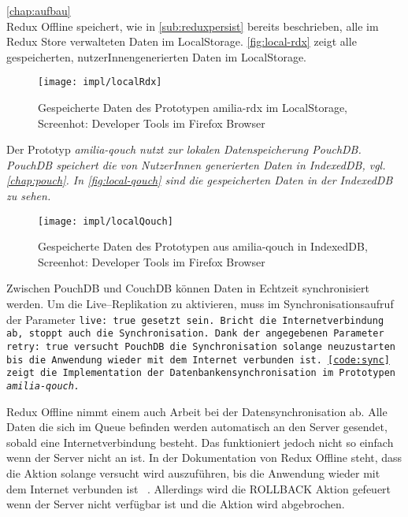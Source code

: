 %
%
\autoref{chap:aufbau}\\
Redux Offline speichert, wie in \autoref{sub:reduxpersist} bereits beschrieben, alle im Redux Store verwalteten Daten im LocalStorage. \autoref{fig:local-rdx} zeigt alle gespeicherten, nutzerInnengenerierten Daten im LocalStorage.
%
\begin{figure}[H]
  \centering
  \texttt{[image: impl/localRdx]}
  \grayRule
  \caption[Gespeicherte Daten im LocalStorage]{Gespeicherte Daten des Prototypen amilia-rdx im LocalStorage,\\Screenhot: Developer Tools im Firefox Browser}
  \label{fig:local-rdx}
\end{figure}
% 
Der Prototyp \it{amilia-qouch} nutzt zur lokalen Datenspeicherung PouchDB. PouchDB speichert die von NutzerInnen generierten Daten in IndexedDB, vgl. \autoref{chap:pouch}. In \autoref{fig:local-qouch} sind die gespeicherten Daten in der IndexedDB zu sehen.
%
\begin{figure}[H]
  \centering
  \texttt{[image: impl/localQouch]}
  \grayRule
  \caption[Gespeicherte Daten in IndexedDB]{Gespeicherte Daten des Prototypen aus amilia-qouch in IndexedDB,\\Screenhot: Developer Tools im Firefox Browser}
  \label{fig:local-qouch}
\end{figure}
%
%
Zwischen PouchDB und CouchDB können Daten in Echtzeit synchronisiert werden. Um die Live--Replikation zu aktivieren, muss im Synchronisationsaufruf der Parameter \tt{live: true} gesetzt sein.
Bricht die Internetverbindung ab, stoppt auch die Synchronisation.
Dank der angegebenen Parameter \tt{retry: true} versucht PouchDB die Synchronisation solange neuzustarten bis die Anwendung wieder mit dem Internet verbunden ist. \autoref{code:sync} zeigt die Implementation der Datenbankensynchronisation im Prototypen \it{amilia-qouch}.
%
\begin{center}
  
\end{center}
Redux Offline nimmt einem auch Arbeit bei der Datensynchronisation ab. Alle Daten die sich im Queue befinden werden automatisch an den Server gesendet, sobald eine Internetverbindung besteht. Das funktioniert jedoch nicht so einfach wenn der Server nicht an ist. In der Dokumentation von Redux Offline steht, dass die Aktion solange versucht wird auszuführen, bis die Anwendung wieder mit dem Internet verbunden ist ~\cite{giving-up}. Allerdings wird die ROLLBACK Aktion gefeuert wenn der Server nicht verfügbar ist und die Aktion wird abgebrochen.
